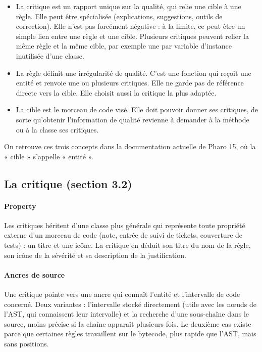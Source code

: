 \documentclass[11pt,a4paper]{article}
\begin{document}
\begin{itemize}
  \item La critique est un rapport unique sur la qualité, qui relie une cible à une règle. Elle peut être spécialisée (explications, suggestions, outils de correction). Elle n’est pas forcément négative : à la limite, ce peut être un simple lien entre une règle et une cible. Plusieurs critiques peuvent relier la même règle et la même cible, par exemple une par variable d’instance inutilisée d’une classe.
  \item La règle définit une irrégularité de qualité. C’est une fonction qui reçoit une entité et renvoie une ou plusieurs critiques. Elle ne garde pas de référence directe vers la cible. Elle choisit aussi la critique la plus adaptée.
  \item La cible est le morceau de code visé. Elle doit pouvoir donner ses critiques, de sorte qu’obtenir l’information de qualité revienne à demander à la méthode ou à la classe ses critiques.
\end{itemize}

On retrouve ces trois concepts dans la documentation actuelle de Pharo 15, où la « cible » s’appelle « entité ».

\subsection{La critique (section 3.2)}

\paragraph{Property}

Les critiques héritent d’une classe plus générale qui représente toute propriété externe d’un morceau de code (note, entrée de suivi de tickets, couverture de tests) : un titre et une icône. La critique en déduit son titre du nom de la règle, son icône de la sévérité et sa description de la justification.

\paragraph{Ancres de source}

Une critique pointe vers une ancre qui connaît l’entité et l’intervalle de code concerné. Deux variantes : l’intervalle stocké directement (utile avec les nœuds de l’AST, qui connaissent leur intervalle) et la recherche d’une sous-chaîne dans le source, moins précise si la chaîne apparaît plusieurs fois. Le deuxième cas existe parce que certaines règles travaillent sur le bytecode, plus rapide que l’AST, mais sans positions.
\end{document}
